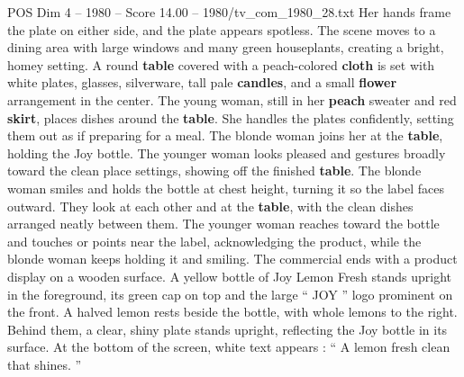 \begin{textsample}{POS Dim 4 – 1980 – Score 14.00 – 1980/tv\_com\_1980\_28.txt}
Her hands frame the plate on either side, and the plate appears spotless.
The scene moves to a dining area with large windows and many green houseplants, creating a bright, homey setting.
A round \textbf{table} covered with a peach-colored \textbf{cloth} is set with white plates, glasses, silverware, tall pale \textbf{candles}, and a small \textbf{flower} arrangement in the center.
The young woman, still in her \textbf{peach} sweater and red \textbf{skirt}, places dishes around the \textbf{table}.
She handles the plates confidently, setting them out as if preparing for a meal.
The blonde woman joins her at the \textbf{table}, holding the Joy bottle.
The younger woman looks pleased and gestures broadly toward the clean place settings, showing off the finished \textbf{table}.
The blonde woman smiles and holds the bottle at chest height, turning it so the label faces outward.
They look at each other and at the \textbf{table}, with the clean dishes arranged neatly between them.
The younger woman reaches toward the bottle and touches or points near the label, acknowledging the product, while the blonde woman keeps holding it and smiling.
The commercial ends with a product display on a wooden surface.
A yellow bottle of Joy Lemon Fresh stands upright in the foreground, its green cap on top and the large “ JOY ” logo prominent on the front.
A halved lemon rests beside the bottle, with whole lemons to the right.
Behind them, a clear, shiny plate stands upright, reflecting the Joy bottle in its surface.
At the bottom of the screen, white text appears : “ A lemon fresh clean that shines. ”

\end{textsample}
